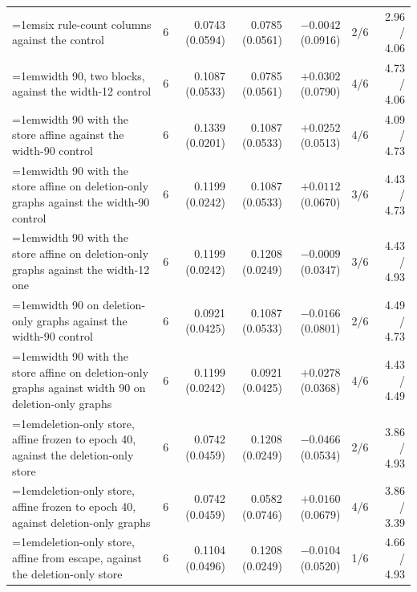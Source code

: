 \begin{table}[H]
\begin{tabular}{@{}>{\raggedright\hangindent=1em\hangafter=1\arraybackslash}p{78.5mm}rrrrrr@{}}
    six rule-count columns against the control & 6 & 0.0743 (0.0594) & 0.0785 (0.0561) & $-0.0042$ (0.0916) & 2/6 & 2.96 / 4.06 \\
    width 90, two blocks, against the width-12 control & 6 & 0.1087 (0.0533) & 0.0785 (0.0561) & $+0.0302$ (0.0790) & 4/6 & 4.73 / 4.06 \\
    width 90 with the store affine against the width-90 control & 6 & 0.1339 (0.0201) & 0.1087 (0.0533) & $+0.0252$ (0.0513) & 4/6 & 4.09 / 4.73 \\
    width 90 with the store affine on deletion-only graphs against the width-90 control & 6 & 0.1199 (0.0242) & 0.1087 (0.0533) & $+0.0112$ (0.0670) & 3/6 & 4.43 / 4.73 \\
    width 90 with the store affine on deletion-only graphs against the width-12 one & 6 & 0.1199 (0.0242) & 0.1208 (0.0249) & $-0.0009$ (0.0347) & 3/6 & 4.43 / 4.93 \\
    width 90 on deletion-only graphs against the width-90 control & 6 & 0.0921 (0.0425) & 0.1087 (0.0533) & $-0.0166$ (0.0801) & 2/6 & 4.49 / 4.73 \\
    width 90 with the store affine on deletion-only graphs against width 90 on deletion-only graphs & 6 & 0.1199 (0.0242) & 0.0921 (0.0425) & $+0.0278$ (0.0368) & 4/6 & 4.43 / 4.49 \\
    deletion-only store, affine frozen to epoch 40, against the deletion-only store & 6 & 0.0742 (0.0459) & 0.1208 (0.0249) & $-0.0466$ (0.0534) & 2/6 & 3.86 / 4.93 \\
    deletion-only store, affine frozen to epoch 40, against deletion-only graphs & 6 & 0.0742 (0.0459) & 0.0582 (0.0746) & $+0.0160$ (0.0679) & 4/6 & 3.86 / 3.39 \\
    deletion-only store, affine from escape, against the deletion-only store & 6 & 0.1104 (0.0496) & 0.1208 (0.0249) & $-0.0104$ (0.0520) & 1/6 & 4.66 / 4.93 \\
    \hline
  \end{tabular}
\end{table}

